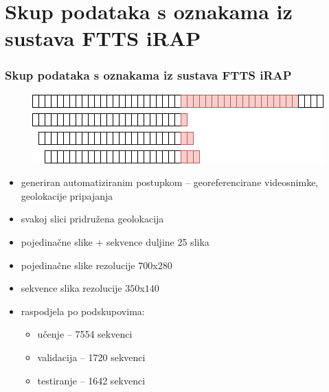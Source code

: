 \documentclass{beamer}
\begin{document}
\section{Skup podataka s oznakama iz sustava FTTS iRAP}
\begin{frame}

\frametitle{Skup podataka s oznakama iz sustava FTTS iRAP}

\begin{figure}[H]
\centering
\includegraphics[scale=0.5]{images/sequence_making.png}
\end{figure} 

\begin{itemize}
\item generiran automatiziranim postupkom -- georeferencirane videosnimke, geolokacije pripajanja
\item svakoj slici pridružena geolokacija
 \item pojedinačne slike + sekvence duljine 25 slika
 \item pojedinačne slike rezolucije $700$x$280$
 \item sekvence slika rezolucije $350$x$140$
   \item raspodjela po podskupovima:
  \begin{itemize}
   \item učenje -- 7554 sekvenci
   \item validacija -- 1720 sekvenci
   \item testiranje -- 1642 sekvenci
  \end{itemize}
 \end{itemize}

\end{frame}
\end{document}
